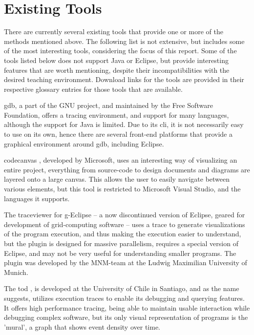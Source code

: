 \section{Existing Tools}\label{PreTools}%

There are currently several existing tools that provide one or more of the methods mentioned above.
The following list is not extensive, but includes some of the most interesting tools, considering the focus of this report.
Some of the tools listed below does not support Java or Eclipse, but provide interesting features that are worth mentioning, despite their incompatibilities with the desired teaching environment.
Download links for the tools are provided in their respective glossary entries for those tools that are available.

\gls{gdb}, a part of the GNU project, and maintained by the Free Software Foundation, offers a tracing environment, and support for many languages, although the support for Java is limited.
Due to its \gls{cli}, it is not necessarily easy to use on its own, hence there are several front-end platforms that provide a graphical environment around \gls{gdb}, including Eclipse.

\Gls{codecanvas} \cite{Deline2010}, developed by Microsoft, uses an interesting way of visualizing an entire project, everything from source-code to design documents and diagrams are layered onto a large canvas.
This allows the user to easily navigate between various elements, but this tool is restricted to Microsoft Visual Studio, and the languages it supports.

The \gls{traceviewer} \cite{Thomas2010} for g-Eclipse -- a now discontinued version of Eclipse, geared for development of grid-computing software -- uses a trace to generate visualizations of the program execution, and thus making the execution easier to understand, but the plugin is designed for massive parallelism, requires a special version of Eclipse, and may not be very useful for understanding smaller programs.
The plugin was developed by the MNM-team at the Ludwig Maximilian University of Munich.

The \gls{tod} \cite{Pothier2007}, is developed at the University of Chile in Santiago, and as the name suggests, utilizes execution traces to enable its debugging and querying features.
It offers high performance tracing, being able to maintain usable interaction while debugging complex software, but its only visual representation of programs is the 'mural', a graph that shows event density over time.


